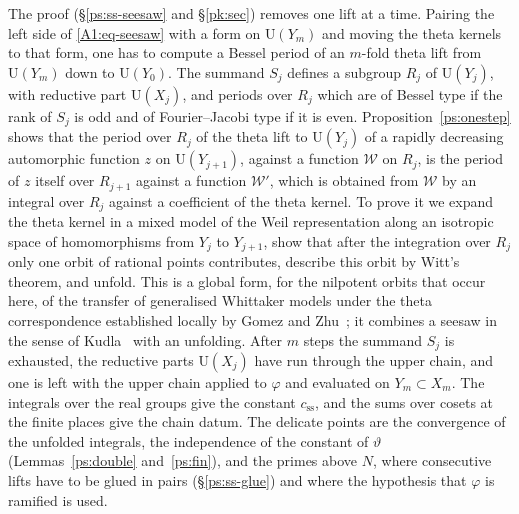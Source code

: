 \documentclass[10pt]{amsart}
\theoremstyle{definition}
\theoremstyle{remark}
\providecommand{\auU}{\mathrm U}
\begin{document}
The proof (\S\ref{ps:ss-seesaw} and \S\ref{pk:sec}) removes one lift at a time. Pairing the
left side of \eqref{A1:eq-seesaw} with a form on $\auU(Y_m)$ and moving the theta kernels to that
form, one has to compute a Bessel period of an $m$-fold theta lift from $\auU(Y_m)$ down to
$\auU(Y_0)$. The summand $S_j$ defines a subgroup $R_j$ of $\auU(Y_j)$, with reductive part $\auU(X_j)$, and
periods over $R_j$ which are of Bessel type if the rank of
$S_j$ is odd and of Fourier--Jacobi type if it is even. Proposition~\ref{ps:onestep} shows that
the period over $R_j$ of the theta lift to $\auU(Y_j)$ of a rapidly decreasing automorphic
function $z$ on $\auU(Y_{j+1})$,
against a function $\mathcal W$ on $R_j$, is the period of $z$ itself over $R_{j+1}$ against a
function $\mathcal W'$, which is obtained from $\mathcal W$ by an integral over $R_j$ against a
coefficient of the theta kernel. To prove it we expand the theta kernel in a mixed model of the
Weil representation along an isotropic space of homomorphisms from $Y_j$ to $Y_{j+1}$, show that
after the integration over $R_j$ only one orbit of rational points contributes, describe this
orbit by Witt's theorem, and unfold. This is a global form, for the nilpotent orbits that occur here, of the
transfer of generalised Whittaker models under the theta correspondence established locally by
Gomez and Zhu~\cite{GomezZhu}; it combines a seesaw in the sense of Kudla~\cite{KudlaSeesaw} with
an unfolding. After $m$ steps the summand $S_j$ is exhausted, the reductive parts $\auU(X_j)$ have run through
the upper chain, and one is left with the upper chain applied to $\varphi$ and evaluated on
$Y_m\subset X_m$. The integrals over the real groups give the constant $c_{\mathrm{ss}}$, and
the sums over cosets at the finite places give the chain datum. The delicate points are the
convergence of the unfolded integrals, the independence of the constant of $\vartheta$
(Lemmas~\ref{ps:double} and~\ref{ps:fin}), and the primes above $N$, where consecutive lifts have
to be glued in pairs (\S\ref{ps:ss-glue}) and where the hypothesis that $\varphi$ is ramified is
used.
\end{document}

